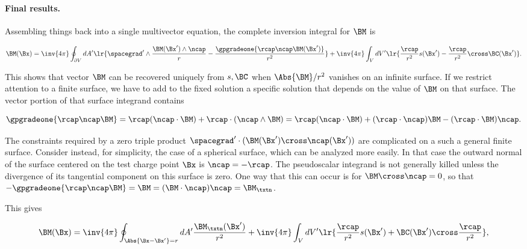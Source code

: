 \paragraph{Final results.}

Assembling things back into a single multivector equation, the complete inversion integral for \( \BM \) is

\begin{dmath}\label{eqn:emtProblemSet1Problem5AppendixGA:600}
\BM(\Bx)
=
\inv{4 \pi} \oint_{\partial V} dA' 
\lr{
\spacegrad' \wedge 
\frac{\BM(\Bx') \wedge \ncap}{r}
-\frac{\gpgradeone{ \rcap \ncap \BM(\Bx') }}{r^2}
}
+
\inv{4 \pi} \int_V dV' \lr{
\frac{\rcap}{r^2} s(\Bx') - 
\frac{\rcap}{r^2} \cross \BC(\Bx') }.
\end{dmath}

This shows that vector \( \BM \) can be recovered uniquely from \( s, \BC \) when \( \Abs{\BM}/r^2 \) vanishes on an infinite surface.  
If we restrict attention to a finite surface, we have to add to the fixed solution a specific solution that depends on the value of \( \BM \) on that surface.  The vector portion of that surface integrand contains

\begin{dmath}\label{eqn:emtProblemSet1Problem5AppendixGA:640}
\gpgradeone{ \rcap \ncap \BM }
=
\rcap (\ncap \cdot \BM )
+
\rcap \cdot (\ncap \wedge \BM )
=
\rcap (\ncap \cdot \BM )
+
(\rcap \cdot \ncap) \BM 
-
(\rcap \cdot \BM ) \ncap.
\end{dmath}

The constraints required by a zero triple product \( \spacegrad' \cdot (\BM(\Bx') \cross \ncap(\Bx')) \) are complicated on a such a general finite surface.  
Consider instead, for simplicity, the case of a spherical surface, which can be analyzed more easily.  
In that case the outward normal of the surface centered on the test charge point \( \Bx \) is \( \ncap = -\rcap \).  The pseudoscalar integrand is not generally killed unless the divergence of its tangential component on this surface is zero.  One way that this can occur is for \( \BM \cross \ncap = 0 \), so that \( -\gpgradeone{ \rcap \ncap \BM } = \BM = (\BM \cdot \ncap) \ncap = \BM_\txtn \).  

This gives

\begin{dmath}\label{eqn:emtProblemSet1Problem5AppendixGA:620}
\BM(\Bx)
=
\inv{4 \pi} \oint_{\Abs{\Bx - \Bx'} = r} dA' \frac{\BM_\txtn(\Bx')}{r^2}
+
\inv{4 \pi} \int_V dV' \lr{
\frac{\rcap}{r^2} s(\Bx') + 
\BC(\Bx') \cross \frac{\rcap}{r^2} },
\end{dmath}

